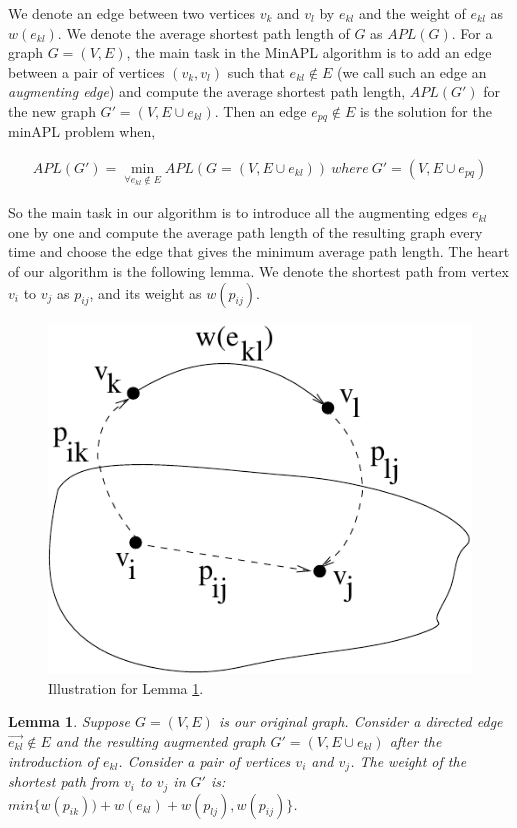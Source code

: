 \documentclass[10pt,letterpaper]{article}
\newtheorem{lemma}{Lemma}
\begin{document}
We denote an edge between two vertices $v_k$ and $v_l$ by $e_{kl}$ and the weight of $e_{kl}$ as 
$w(e_{kl})$. We denote the average shortest path length of $G$ as $APL(G)$.  
For a graph $G=(V,E)$, the main task in the MinAPL algorithm is to add an edge between a pair of vertices $(v_k,v_l)$ 
such that $e_{kl}\not\in E$ (we call such an edge an {\em augmenting edge}) and compute the average shortest path length, $APL(G')$  
for the new graph $G'=(V,E\cup e_{kl})$. Then an edge $e_{pq}\not\in E$ is the solution for 
the minAPL problem when, 

\begin{multline}
APL(G') =\min_{\forall e_{kl}\not\in E} APL(G=(V,E\cup e_{kl}))
~
{where} ~ G' = (V,E\cup e_{pq})
\end{multline}

So the main task in our algorithm is to introduce all the augmenting edges $e_{kl}$ one by one and compute the average 
path length of the resulting graph every time and choose the edge that gives the minimum average path 
length. The heart of our algorithm is the following lemma. We denote the shortest path from vertex $v_i$ 
to $v_j$ as $p_{ij}$, and its weight as $w(p_{ij})$. 

\begin{figure}
\centering
\includegraphics[scale=0.5]{Fig1.pdf}
\caption{Illustration for Lemma \ref{lemma2}.}
\label{algo_fig}
\end{figure}

\begin{lemma}
\label{lemma2}Suppose $G=(V,E)$ is our original graph. 
Consider a directed edge $\overrightarrow{e_{kl}}\not\in E$ and the resulting augmented graph $G'=(V,E\cup e_{kl})$
 after the introduction of $e_{kl}$. 
Consider a pair of vertices $v_i$ and $v_j$. 
The weight of the shortest path from $v_i$ to $v_j$ in $G'$ 
is: $min\{w(p_{ik}))+w(e_{kl})+w(p_{lj}), w(p_{ij})\}$.
\end{lemma}
\end{document}
